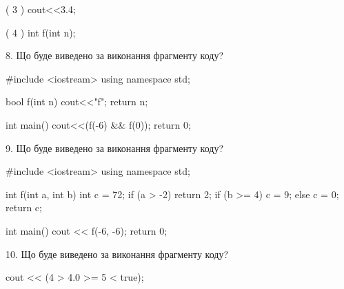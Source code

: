 \documentclass[11pt, ukrainian]{article}
\begin{document}
\begin{large}
( 3 ) cout<<3.4;

( 4 ) int f(int n);


8. Що буде виведено за виконання фрагменту коду?

#include <iostream>
using namespace std;

bool f(int n){
    cout<<"f";
    return n;
}

int main(){
    cout<<(f(-6) && f(0));
    return 0;
}


9. Що буде виведено за виконання фрагменту коду?

#include <iostream>
using namespace std;

int f(int a, int b){
    int c = 72;
    if (a > -2)
        return 2;
    if (b >= 4)
         c = 9;
    else 
        c = 0;
    return c;
}

int main(){
    cout << f(-6, -6);
    return 0;
}


10. Що буде виведено за виконання фрагменту коду?

cout << (4 > 4.0 >= 5 < true);

\end{large}
\newpage
\end{document}
